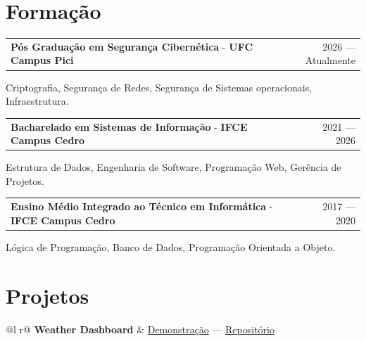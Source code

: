 \documentclass[a4paper,12pt]{article}
\makeatletter
\newenvironment{role}[3]{
  \item
  \begin{tabularx}{\linewidth}{@{}l X r@{}}
    {\small\textbf{#1}}\ \ {\footnotesize\if\relax\detokenize{#3}\relax\else #3\fi} & \hfill & #2 \\
  \end{tabularx}
    }
    {
    }
\newenvironment{education}[3]
    {
    \begin{tabularx}{\linewidth}{@{}l X r@{}}
    \textbf{#1} - \textbf{#2} & \hfill &  #3 \\[3.75pt]
    \end{tabularx}
    }
    {
    }
\makeatother
\begin{document}
  

\section{Formação}
    
\begin{education}{Pós Graduação em Segurança Cibernética}{UFC Campus Pici}{2026 — Atualmente}
Criptografia, Segurança de Redes, Segurança de Sistemas operacionais, Infraestrutura.
\end{education}

\begin{education}{Bacharelado em Sistemas de Informação}{IFCE Campus Cedro}{2021 — 2026}
Estrutura de Dados, Engenharia de Software, Programação Web, Gerência de Projetos.
\end{education}

\begin{education}{Ensino Médio Integrado ao Técnico em Informática}{IFCE Campus Cedro}{2017 — 2020}
Lógica de Programação, Banco de Dados, Programação Orientada a Objeto.
\end{education}


\section{Projetos}

\begin{tabularx}{\linewidth}{ @{}l r@{} }
\textbf{Weather Dashboard} & \hfill \href{https://youtu.be/OMvqebhPMrA}{Demonstração} — \href{https://github.com/helpmeagain/weather-dashboard}{Repositório} \\[3.75pt]
  \\[-2pt]
\\[1pt]
\end{tabularx}
\end{document}
